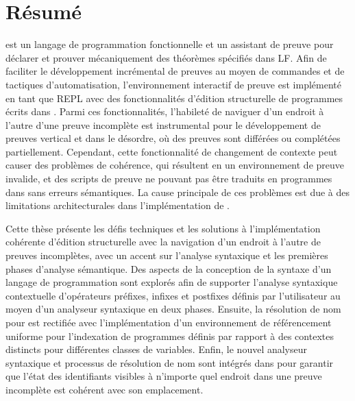 \chapter*{Résumé}

\Beluga est un langage de programmation fonctionnelle et un assistant de preuve pour déclarer et prouver mécaniquement des théorèmes spécifiés dans \acs{LF}.
Afin de faciliter le développement incrémental de preuves au moyen de commandes et de tactiques d'automatisation, l'environnement interactif de preuve \Harpoon est implémenté en tant que \acs{REPL} avec des fonctionnalités d'édition structurelle de programmes écrits dans \Beluga.
Parmi ces fonctionnalités, l'habileté de naviguer d'un endroit à l'autre d'une preuve incomplète est instrumental pour le développement de preuves vertical et dans le désordre, où des preuves sont différées ou complétées partiellement.
Cependant, cette fonctionnalité de changement de contexte peut causer des problèmes de cohérence, qui résultent en un environnement de preuve invalide, et des scripts de preuve ne pouvant pas être traduits en programmes dans \Beluga sans erreurs sémantiques.
La cause principale de ces problèmes est due à des limitations architecturales dans l'implémentation de \Beluga.

Cette thèse présente les défis techniques et les solutions à l'implémentation cohérente d'édition structurelle avec la navigation d'un endroit à l'autre de preuves incomplètes, avec un accent sur l'analyse syntaxique et les premières phases d'analyse sémantique.
Des aspects de la conception de la syntaxe d'un langage de programmation sont explorés afin de supporter l'analyse syntaxique contextuelle d'opérateurs préfixes, infixes et postfixes définis par l'utilisateur au moyen d'un analyseur syntaxique en deux phases.
Ensuite, la résolution de nom pour \Beluga est rectifiée avec l'implémentation d'un environnement de référencement uniforme pour l'indexation de programmes définis par rapport à des contextes distincts pour différentes classes de variables.
Enfin, le nouvel analyseur syntaxique et processus de résolution de nom sont intégrés dans \Harpoon pour garantir que l'état des identifiants visibles à n'importe quel endroit dans une preuve incomplète est cohérent avec son emplacement.
